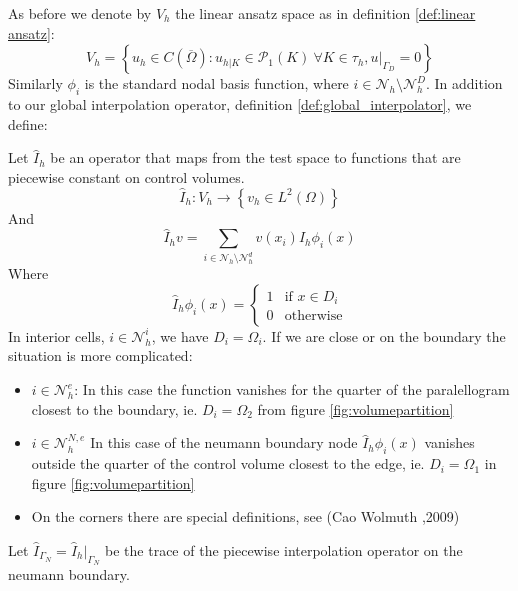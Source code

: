 \documentclass[../Main/main.tex]{subfiles}
\begin{document}
	\par 
	As before we denote by $V_h$ the linear ansatz space as in definition \ref{def:linear ansatz}:
	\begin{equation*}
	V_h = \left \{ u_h \in C(\overline{\Omega}) : u_{h|K} \in \mathcal{P}_1(K) \ \forall K \in \tau_h, u|_{\Gamma_D} = 0  \right \}
	\end{equation*}
	 Similarly $\phi_i$ is the standard nodal basis function, where $i \in \mathcal{N}_h \setminus \mathcal{N}_h^D$.
	In addition to our global interpolation operator, definition \ref{def:global_interpolator}, we define:
	\begin{definition} \label{def:piecewise_interpolator}
		Let $\hat{I}_h$ be an operator that maps from the test space to functions that are piecewise constant on control volumes.
		\begin{equation*}
			\hat{I}_h:V_h\rightarrow \left \{ v_h \in L^2(\Omega) \right \}
		\end{equation*}
		And
		\begin{equation*}
			\hat{I}_h v = \sum_{i\in \mathcal{N}_h\setminus\mathcal{N}_h^d}v(x_i)\hat{I}_h\phi_i(x)
		\end{equation*}
		Where
		\begin{equation}
			\hat{I}_h\phi_i(x)=\left\{\begin{matrix}
				1 & \text{if } x\in D_i\\ 
				0 & \text{otherwise}
			\end{matrix}\right.
		\end{equation}
		In interior cells, $i\in \mathcal{N}_h^i$, we have $D_i = \Omega_i$. If we are close or on the boundary the situation is more complicated: 
		\begin{itemize}
			\item $i \in \mathcal{N}_h^e$: In this case the function vanishes for the quarter of the paralellogram closest to the boundary, ie. $D_i = \Omega_2$ from figure \ref{fig:volumepartition}
			\item $i \in \mathcal{N}_h^{N,e}$ In this case of the neumann boundary node $	\hat{I}_h\phi_i(x)$ vanishes outside the quarter of the control volume closest to the edge, ie. $D_i = \Omega_1$ in figure \ref{fig:volumepartition}
			\item On the corners there are special definitions, see (Cao Wolmuth \cite{https://doi.org/10.1002/num.20525},2009)
		\end{itemize} 
	\end{definition}
	Let $\hat{I}_{\Gamma_N} = \hat{I}_{h}|_{\Gamma_N}$ be the trace of the piecewise interpolation operator on the neumann boundary.
\end{document}
